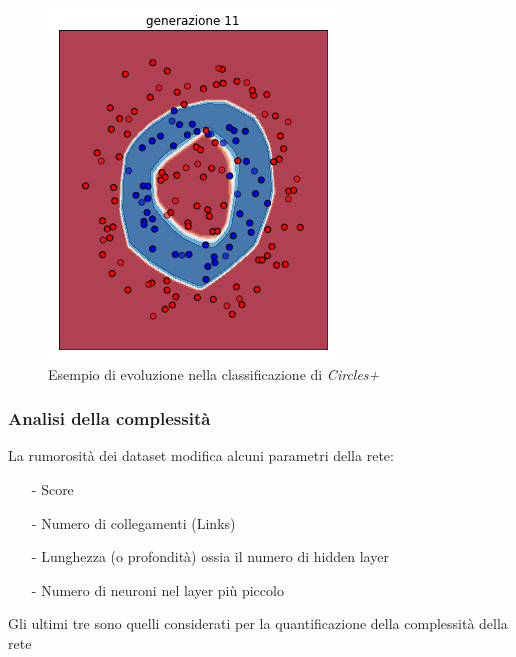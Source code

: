 \documentclass{beamer}
\begin{document}
\begin{frame}
\begin{figure}
  \includegraphics[scale = 0.25]{images/circle+-rnd-log./11.png}
  \caption{\large Esempio di evoluzione nella classificazione di \textit{Circles+}}
 \end{figure}   
\end{frame}

\begin{frame}
 \frametitle{Analisi della complessità}
 La rumorosità dei dataset modifica alcuni parametri della rete:
 \begin{enumerate}
  \item [-] Score
  \item [-] Numero di collegamenti (Links)
  \item [-] Lunghezza (o profondità) ossia il numero di hidden layer 
  \item [-] Numero di neuroni nel layer più piccolo
 \end{enumerate}
 Gli ultimi tre sono quelli considerati per la quantificazione della complessità della rete 
\end{frame}
\end{document}
